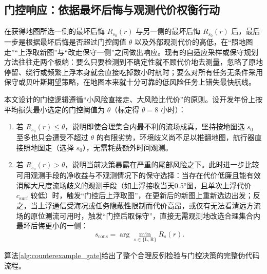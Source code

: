 \subsection{门控响应：依据最坏后悔与观测代价权衡行动}
在获得地图所选一侧的最坏后悔 $R_{s_0}(r)$ 与另一侧的最坏后悔 $R_{\bar{s}_0}(r)$ 后，最后一步是根据最坏后悔是否超过门控阈值 $\theta$ 以及外部观测代价的高低，在“照地图走”“上浮取新图”与“改走保守一侧”之间做出响应。现有的自适应采样或保守规划方法往往走两个极端：要么只要检测到不确定性就不顾代价地去测量，忽略了原地停留、绕行或频繁上浮本身就会直接吃掉数小时航时；要么对所有任务无条件采用保守或贝叶斯期望策略，在地图本来就十分可靠的低风险任务上错失最快航线。

本文设计的门控逻辑遵循“小风险直接走、大风险比代价”的原则。设开发年份上按平均损失最小选定的门控阈值为 $\theta$（标定得 $\theta = 8$ 小时）：
\begin{enumerate}
    \item 若 $R_{s_0}(r) \le \theta$，说明即使合理集合内最不利的流场成真，坚持按地图选 $s_0$ 至多也只会遭受不超过 $\theta$ 的有限劣势，环境歧义尚不足以推翻地图，航行器直接照地图走（选择 $s_0$），无需耗费额外时间观测。
    \item 若 $R_{s_0}(r) > \theta$，说明当前决策暴露在严重的尾部风险之下。此时进一步比较可用观测手段的净收益与不观测情况下的保守选择：当存在代价低廉且能有效消解大尺度流场歧义的观测手段（如上浮接收当天0.5°图，且单次上浮代价 $c_{\text{surf}}$ 较低）时，触发“门控后上浮取图”，在更新后的新图上重新选边出发；反之，当上浮通信受海况或任务隐蔽性限制而代价高昂，或仅有无法看清远方流场的原位测流可用时，触发“门控后取保守”，直接无需观测地改选合理集合内最坏后悔更小的一侧：
    \begin{equation}
    s_{\text{cons}} = \arg\min_{s \in \{\text{L}, \text{R}\}} R_s(r).
    \label{eq:conservative_choice}
    \end{equation}
\end{enumerate}
算法\ref{alg:counterexample_gate}给出了整个合理反例检验与门控决策的完整伪代码流程。

